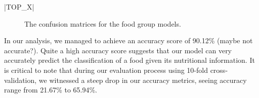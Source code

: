 \documentclass[11pt]{article}
\begin{document}
|TOP_X|
\begin{figure}[htbp]
    \centering
    \qquad
    \qquad
    \caption{The confusion matrices for the \protect{} food group models.}
    \label{fig:confusion-matrices}
\end{figure}

In our analysis, we managed to achieve an accuracy score of 90.12\% (maybe not accurate?). Quite a high accuracy score suggests that our model can very accurately predict the classification of a food given its nutritional information. It is critical to note that during our evaluation process using 10-fold cross-validation, we witnessed a steep drop in our accuracy metrics, seeing accuracy range from 21.67\% to 65.94\%.
\end{document}
